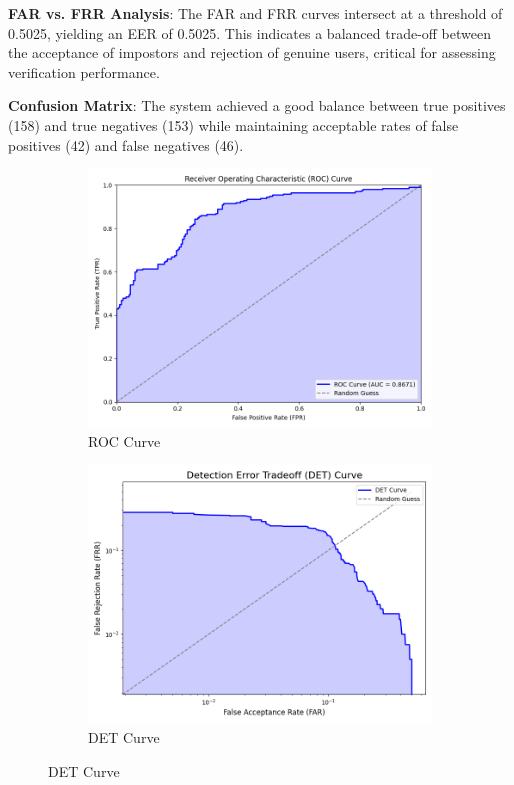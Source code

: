 \textbf{FAR vs. FRR Analysis}: The FAR and FRR curves intersect at a threshold of 0.5025, yielding an EER of 0.5025. This indicates a balanced trade-off between the acceptance of impostors and rejection of genuine users, critical for assessing verification performance.

\textbf{Confusion Matrix}: The system achieved a good balance between true positives (158) and true negatives (153) while maintaining acceptable rates of false positives (42) and false negatives (46).

\begin{figure}[!ht]
    \centering
    \begin{subfigure}[t]{0.48\columnwidth}
        \includegraphics[width=\textwidth]{./images/plots/ver/roc_curve.png}
        \caption{ROC Curve}
        \label{fig:roc_curve}
    \end{subfigure}
    \hfill
    \begin{subfigure}[t]{0.48\columnwidth}
        \includegraphics[width=\textwidth]{./images/plots/ver/det_curve.png}
        \caption{DET Curve}
        \label{fig:det_curve}
    \end{subfigure}
\end{figure}

